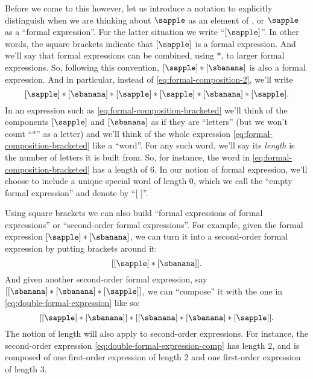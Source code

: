 Before we come to this however, let us introduce a notation to explicitly distinguish when we are thinking about $\sapple$ as an element of \setA, or $\sapple$ as a ``formal expression''.
For the latter situation we write ``$[\sapple]$''.
In other words, the square brackets indicate that $[\sapple]$ is a formal expression.
And we'll say that formal expressions can be combined, using $*$, to larger formal expressions.
So, following this convention, $[\sapple] * [\sbanana]$ is also a formal expression.
And in particular, instead of \cref{eq:formal-composition-2}, we'll write
\begin{equation}
    \label{eq:formal-composition-bracketed}
    [\sapple] * [\sbanana] * [\sapple] * [\sapple] * [\sbanana] * [\sapple].
\end{equation}
%
In an expression such as \cref{eq:formal-composition-bracketed} we'll think of the components $[\sapple]$ and $[\sbanana]$ as if they are ``letters'' (but we won't count ``$*$'' as a letter) and we'll think of the whole expression \cref{eq:formal-composition-bracketed} like a ``word''.
For any such word, we'll say its \emph{length} is the number of letters it is built from.
So, for instance, the word in \cref{eq:formal-composition-bracketed} has a length of $6$.
In our notion of formal expression, we'll choose to include a unique special word of length $0$, which we call the ``empty formal expression'' and denote by ``[ ]''.

Using square brackets we can also build ``formal expressions of formal expressions'' or ``second-order formal expressions''.
For example, given the formal expression $[\sapple] * [\sbanana]$, we can turn it into a second-order formal expression by putting brackets around it:
\begin{equation}
    \label{eq:double-formal-expression}
    [[\sapple] * [\sbanana]].
\end{equation}
And given another second-order formal expression, say $[[\sbanana] * [\sbanana] * [\sapple]]$, we can ``compose'' it with the one in \cref{eq:double-formal-expression} like so:
\begin{equation}
    \label{eq:double-formal-expression-comp}
    [[\sapple] * [\sbanana]] * [[\sbanana] * [\sbanana] * [\sapple]].
\end{equation}
The notion of length will also apply to second-order expressions.
For instance, the second-order expression \cref{eq:double-formal-expression-comp} has length 2, and is composed of one first-order expression of length 2 and one first-order expression of length 3.

